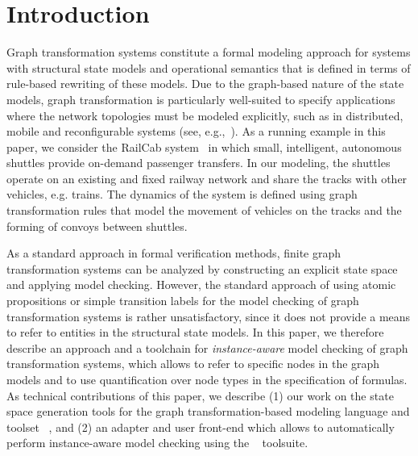 
\section{Introduction}
\label{sec:introduction}

Graph transformation systems constitute a formal modeling approach for systems with structural state models and operational semantics that is defined in terms of rule-based rewriting of these models. Due to the graph-based nature of the state models, graph transformation is particularly well-suited to specify applications where the network topologies must be modeled explicitly, such as in distributed, mobile and reconfigurable systems (see, e.g.,~\cite{HGM06}). As a running example in this paper, we consider the RailCab system~\cite{RailCab} in which small, intelligent, autonomous shuttles provide on-demand passenger transfers. In our modeling, the shuttles operate on an existing and fixed railway network and share the tracks with other vehicles, e.g. trains. The dynamics of the system is defined using graph transformation rules that model the movement of vehicles on the tracks and the forming of convoys between shuttles.

As a standard approach in formal verification methods, finite graph transformation systems can be analyzed by constructing an explicit state space and applying model checking. However, the standard approach of using atomic propositions or simple transition labels for the model checking of graph transformation systems is rather unsatisfactory, since it does not provide a means to refer to entities in the structural state models. In this paper, we therefore describe an approach and a toolchain for \emph{instance-aware} model checking of graph transformation systems, which allows to refer to specific nodes in the graph models and to use quantification over node types in the specification of formulas. As technical contributions of this paper, we describe (1) our work on the state space generation tools for the graph transformation-based modeling language and toolset \henshin~\cite{henshin}, and (2) an adapter and user front-end which allows to automatically perform instance-aware model checking using the \mcrl~\cite{mcrl2} toolsuite.



% 
% 
